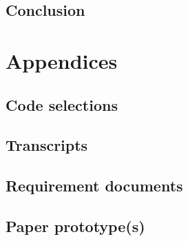 \documentclass[]{report}
\begin{document}

\section{Conclusion}

\chapter{Appendices}
\section{Code selections}

\section{Transcripts}

\section{Requirement documents}

\section{Paper prototype(s)}
\end{document}
